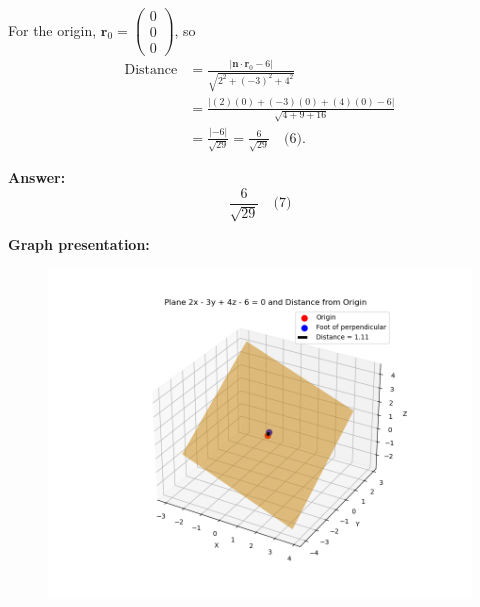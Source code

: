 \documentclass[journal]{IEEEtran}
\begin{document}
For the origin, $\mathbf{r}_0 = \begin{pmatrix} 0 \\ 0 \\ 0 \end{pmatrix}$, so
\begin{equation}
\begin{split}
\text{Distance} &= \frac{|\mathbf{n} \cdot \mathbf{r}_0 - 6|}{\sqrt{2^2 + (-3)^2 + 4^2}} \\
&= \frac{|(2)(0) + (-3)(0) + (4)(0) - 6|}{\sqrt{4 + 9 + 16}} \\
&= \frac{|-6|}{\sqrt{29}} = \frac{6}{\sqrt{29}} \quad \text{(6)}.
\end{split}
\end{equation}

\vspace{0.5em}
\textbf{Answer:}
\begin{equation}
\boxed{\frac{6}{\sqrt{29}}} \quad \text{(7)}
\end{equation}

\textbf{Graph presentation:}
\begin{figure}[H]
\begin{center}
\includegraphics[width=0.6\columnwidth]{Figs/fig7.png}
\end{center}
\caption{}
\label{fig:Fig}
\end{figure}
\end{document}
